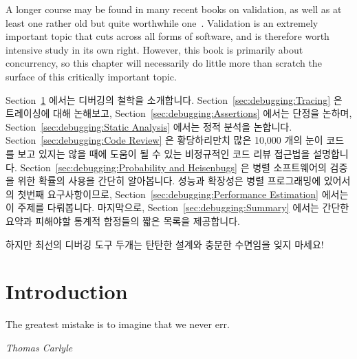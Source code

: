 A longer course may be found in many recent books on validation, as
well as at least one rather old but quite worthwhile
one~\cite{GlenfordJMyers1979}.
Validation is an extremely important topic that cuts across all forms
of software, and is therefore worth intensive study in its own right.
However, this book is primarily about concurrency, so this chapter
will necessarily do little more than scratch the surface of this
critically important topic.
\fi

Section~\ref{sec:debugging:Introduction}
에서는 디버깅의 철학을 소개합니다.
Section~\ref{sec:debugging:Tracing}
은 트레이싱에 대해 논해보고,
Section~\ref{sec:debugging:Assertions}
에서는 단정을 논하며,
Section~\ref{sec:debugging:Static Analysis}
에서는 정적 분석을 논합니다.
Section~\ref{sec:debugging:Code Review}
은 황당하리만치 많은 10,000 개의 눈이 코드를 보고 있지는 않을 때에 도움이 될 수
있는 비정규적인 코드 리뷰 접근법을 설명합니다.
Section~\ref{sec:debugging:Probability and Heisenbugs}
은 병렬 소프트웨어의 검증을 위한 확률의 사용을 간단히 알아봅니다.
성능과 확장성은 병렬 프로그래밍에 있어서의 첫번째 요구사항이므로,
Section~\ref{sec:debugging:Performance Estimation} 에서는 이 주제를 다뤄봅니다.
마지막으로,
Section~\ref{sec:debugging:Summary}
에서는 간단한 요약과 피해야할 통계적 함정들의 짧은 목록을 제공합니다.

하지만 최선의 디버깅 도구 두개는 탄탄한 설계와 충분한 수면임을 잊지 마세요!

\section{Introduction}
\label{sec:debugging:Introduction}
%
\epigraph{The greatest mistake is to imagine that we never err.}
	 {\emph{Thomas Carlyle}}

